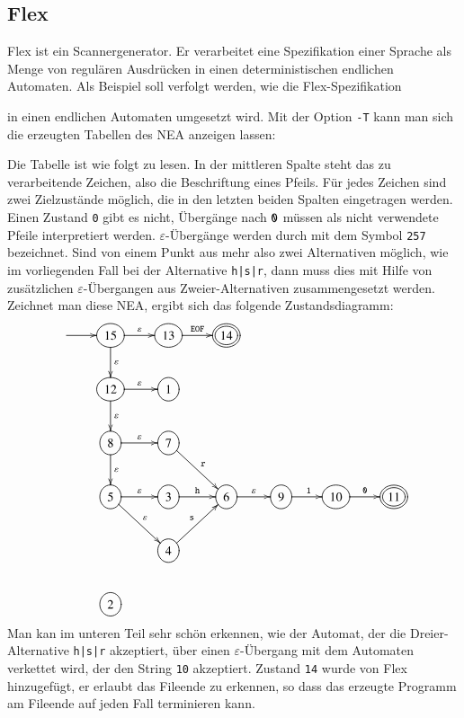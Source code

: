 \subsection{Flex}
%
%
%
Flex ist ein Scannergenerator.
Er verarbeitet eine Spezifikation einer
Sprache als Menge von regulären Ausdrücken in einen deterministischen 
endlichen Automaten.
Als Beispiel soll verfolgt werden, wie die
Flex-Spezifikation

in einen endlichen Automaten umgesetzt wird.
Mit der Option {\tt -T}
kann man sich die erzeugten Tabellen des NEA anzeigen lassen:

Die Tabelle ist wie folgt zu lesen.
In der mittleren Spalte steht das zu verarbeitende Zeichen, also
die Beschriftung eines Pfeils.
Für jedes Zeichen sind zwei Zielzustände
möglich, die in den letzten beiden Spalten eingetragen werden.
Einen
Zustand {\tt 0} gibt es nicht, Übergänge nach ${\tt 0}$ müssen als
nicht verwendete Pfeile interpretiert werden.
$\varepsilon$-Übergänge
werden durch mit dem Symbol {\tt 257} bezeichnet.
Sind von einem Punkt
aus mehr also zwei Alternativen möglich, wie im vorliegenden Fall
bei der Alternative {\tt h|s|r}, dann muss dies mit Hilfe von zusätzlichen
$\varepsilon$-Übergangen aus Zweier-Alternativen zusammengesetzt werden.
Zeichnet man diese NEA, ergibt sich das folgende Zustandsdiagramm:
\[
\entrymodifiers={++[o][F]}
\xymatrix{
*+\txt{}\ar[r]
	&{15} \ar[r]^{\varepsilon} \ar[d]^{\varepsilon}
		&{13}\ar[r]^{{\tt EOF}}
			&*++[o][F=]{14}
\\
*+\txt{}
	&{12}\ar[d]^{\varepsilon} \ar[r]^{\varepsilon}
		&{1}
\\
*+\txt{}
	&{8}\ar[d]^{\varepsilon} \ar[r]^{\varepsilon}
		&{7}\ar[dr]^{\tt r}
\\
*+\txt{}
	&{5}\ar[dr]^{\varepsilon} \ar[r]^{\varepsilon}
		&{3}\ar[r]^{\tt h}
			&{6}\ar[r]^{\varepsilon}
				&{9}\ar[r]^{\tt 1}
					&{10}\ar[r]^{\tt 0}
						&*++[o][F=]{11}
\\
*+\txt{}
	&*+\txt{}
		&{4}\ar[ur]^{\tt s}
\\
*+\txt{}
	&{2}
}
\]
Man kan im unteren Teil sehr schön erkennen, wie der Automat, der
die Dreier-Alternative {\tt h|s|r} akzeptiert, über einen
$\varepsilon$-Übergang mit dem Automaten verkettet wird, der 
den String {\tt 10} akzeptiert.
Zustand {\tt 14} wurde von Flex
hinzugefügt, er erlaubt das Fileende zu erkennen, so dass das
erzeugte Programm am Fileende auf jeden Fall terminieren kann.


